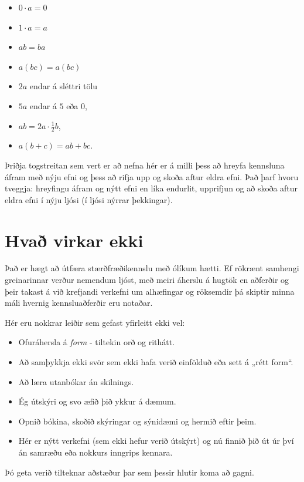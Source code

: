 \documentclass[
  icelandic,
]{book}
\providecommand{\tightlist}{%
  \setlength{\itemsep}{0pt}\setlength{\parskip}{0pt}}
\begin{document}
\begin{itemize}
\tightlist
\item
  \(0 \cdot a = 0\)
\item
  \(1 \cdot a = a\)
\item
  \(ab = ba\)
\item
  \(a(bc)=a(bc)\)
\item
  \(2a\) endar á sléttri tölu
\item
  \(5a\) endar á \(5\) eða \(0\),
\item
  \(ab = 2a \cdot \frac{1}{2}b\),
\item
  \(a(b+c) = ab + bc\).
\end{itemize}

Þriðja togstreitan sem vert er að nefna hér er á milli þess að hreyfa kennsluna áfram með nýju efni og þess að rifja upp og skoða aftur eldra efni. Það þarf hvoru tveggja: hreyfingu áfram og nýtt efni en líka endurlit, upprifjun og að skoða aftur eldra efni í nýju ljósi (í ljósi nýrrar þekkingar).

\section{Hvað virkar ekki}\label{virkar-ekki}

Það er hægt að útfæra stærðfræðikennslu með ólíkum hætti. Ef rökrænt samhengi greinarinnar verður nemendum ljóst, með meiri áherslu á hugtök en aðferðir og þeir takast á við krefjandi verkefni um alhæfingar og röksemdir þá skiptir minna máli hvernig kennsluaðferðir eru notaðar.

Hér eru nokkrar leiðir sem gefast yfirleitt ekki vel:

\begin{itemize}
\tightlist
\item
  Ofuráhersla á \emph{form} - tiltekin orð og rithátt.
\item
  Að samþykkja ekki svör sem ekki hafa verið einfölduð eða sett á „rétt form``.
\item
  Að læra utanbókar án skilnings.
\item
  Ég útskýri og svo æfið þið ykkur á dæmum.
\item
  Opnið bókina, skoðið skýringar og sýnidæmi og hermið eftir þeim.
\item
  Hér er nýtt verkefni (sem ekki hefur verið útskýrt) og nú finnið þið út úr því án samræðu eða nokkurs inngrips kennara.
\end{itemize}

Þó geta verið tilteknar aðstæður þar sem þessir hlutir koma að gagni.
\end{document}

